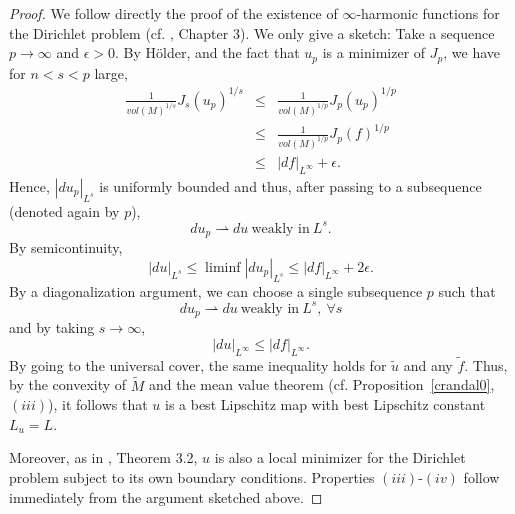 \documentclass{ip-journal}
\theoremstyle{definition}
\numberwithin{equation}{section}
\begin{document}
\begin{proof} We follow directly the proof of the existence of $\infty$-harmonic functions for the Dirichlet problem (cf. \cite{lindqvist}, Chapter 3).  We only give a sketch:
Take a sequence $p\rightarrow \infty$ and $\epsilon >0$. By H\"older, and the fact that $u_p$ is a minimizer of $J_p$, we have for $n<s<p$ large,   
\begin{eqnarray*}
\frac{1}{vol(M)^{1/s}}J_s(u_p)^{1/s} &\leq& \frac{1}{vol(M)^{1/p}} J_p(u_p)^{1/p} \\
&\leq& \frac{1}{vol(M)^{1/p}} J_p(f)^{1/p} \\
&\leq&  |df|_{L^\infty}+\epsilon.
\end{eqnarray*}
 Hence, $|du_p|_{L^s}$ is uniformly bounded and thus, after passing to a subsequence 
(denoted again by $p$),
\[
du_p \rightharpoonup du \ \mbox{weakly in} \  L^s.
\]
By semicontinuity,
\[
 |du|_{L^s} \leq \liminf  |du_p |_{L^s} \leq |df|_{L^\infty}+2\epsilon.
\]
By a diagonalization argument, we can choose a single subsequence $p$ such that
\[
du_p \rightharpoonup du  \ \mbox{weakly in}  \ L^s,\ \forall s
\]
 and by taking $s \rightarrow \infty$,
\[
|du |_{L^{\infty}} \leq |df|_{L^\infty}.
\]
By going to the universal cover, the same inequality holds for $\tilde u$ and any $\tilde f$. Thus, by the convexity of $\tilde M$ and
 the mean value theorem (cf. Proposition~\ref{crandal0}, $(iii)$), it follows that $u$ is a best Lipschitz map with best Lipschitz constant $L_u=L$. 

Moreover, as in \cite{lindqvist}, Theorem 3.2, $u$ is also a local minimizer for the Dirichlet problem subject to its own boundary conditions.  
Properties $(iii)$-$(iv)$ follow immediately from the argument sketched above.

\end{proof}
\end{document}
